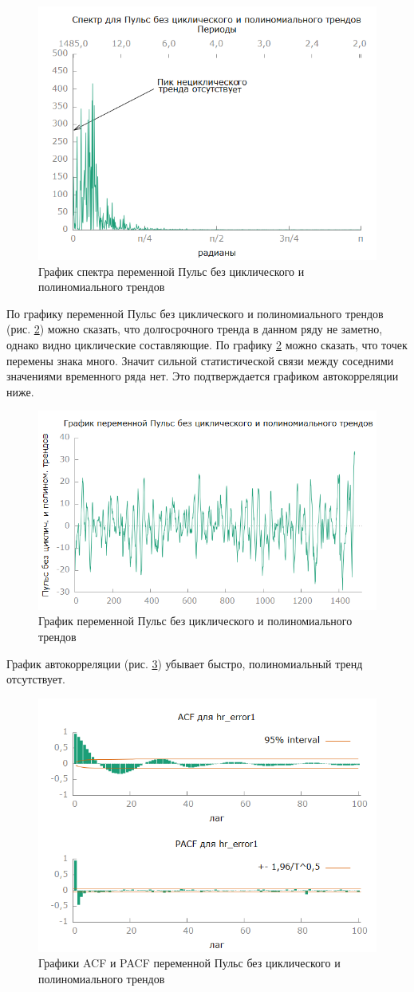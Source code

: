 \documentclass[a4paper,12pt]{article}
\begin{document}
\begin{figure}[H]
	\centering
	\includegraphics[width=0.5\linewidth]{../[graphics]/hr_error1_spectr.png}
	\caption{График спектра переменной Пульс без циклического и полиномиального трендов}
	\label{fig:hr_error1_spectr}
\end{figure}

По графику переменной Пульс без циклического и полиномиального трендов (рис. \ref{fig:hr_error1}) можно сказать, что долгосрочного тренда в данном ряду не заметно, однако видно циклические составляющие. По графику \ref{fig:hr_error1} можно сказать, что точек перемены знака много. Значит сильной статистической связи между соседними значениями временного ряда нет. Это подтверждается графиком автокорреляции ниже.

\begin{figure}[H]
	\centering
	\includegraphics[width=0.5\linewidth]{../[graphics]/hr_error1.png}
	\caption{График переменной Пульс без циклического и полиномиального трендов}
	\label{fig:hr_error1}
\end{figure}

График автокорреляции (рис. \ref{fig:hr_error1_acf_100}) убывает быстро, полиномиальный тренд отсутствует.

\begin{figure}[H]
	\centering
	\includegraphics[width=0.5\linewidth]{../[graphics]/hr_error1_acf_100.png}
	\caption{Графики ACF и PACF переменной Пульс без циклического и полиномиального трендов}
	\label{fig:hr_error1_acf_100}
\end{figure}
\end{document}
